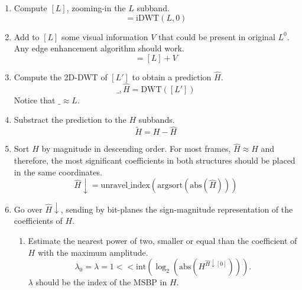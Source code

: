 \begin{enumerate}

\item Compute $[L]$, zooming-in the $L$ subband.
  \begin{equation}
    [L] = \text{iDWT}(L, 0)
  \end{equation}
  
\item Add to $[L]$ some visual information $V$ that could be present
  in original $L^0$. Any edge enhancement algorithm should work.
  \begin{equation}
    [L'] = [L] + V
  \end{equation}

\item Compute the 2D-DWT of $[L']$ to obtain a prediction $\hat{H}$.
  \begin{equation}
    \_, \hat{H} = \text{DWT}([L'])
  \end{equation}
  Notice that $\_\approx L$.

\item Substract the prediction to the $H$ subbands.
  \begin{equation}
    \tilde{H} = H-\hat{H}
  \end{equation}

\item Sort $\hat{H}$ by magnitude in descending order. For most
  frames, $\hat{H}\approx H$ and therefore, the most significant
  coefficients in both structures should be placed in the same
  coordinates.
  \begin{equation}
    \hat{H}\downarrow = \text{unravel\_index}(\text{argsort}(\text{abs}(\hat{H})))
  \end{equation}

\item Go over $\hat{H}\downarrow$, sending by bit-planes the
  sign-magnitude representation of the coefficients of $H$.

  \begin{enumerate}

  \item Estimate the nearest power of two, smaller or equal than the
    coefficient of $H$ with the maximum amplitude.
    \begin{equation}
      \lambda_0 = \lambda = 1 << \text{int}(\log_2(\text{abs}(H^{\hat{H}\downarrow[0]}))).
    \end{equation}
    $\lambda$ should be the index of the MSBP in $H$.
    

\end{enumerate}
\end{enumerate}
